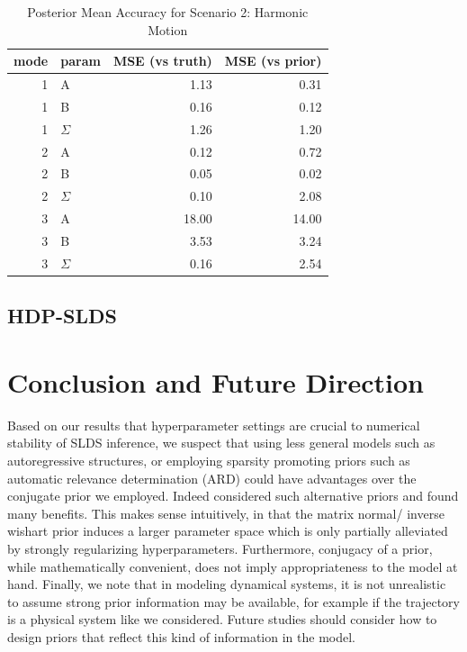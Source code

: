 \documentclass{article} %
\begin{document}
\begin{table}[]
\centering
\caption{Posterior Mean Accuracy for Scenario 2: Harmonic Motion}
\label{tbl:scen2}
\begin{tabular}{rlrr}
\hline
mode & param & MSE (vs truth) & MSE (vs prior) \\ \hline
1    & A     & 1.13      & 0.31       \\
1    & B     & 0.16      & 0.12       \\
1    & $\Sigma$ & 1.26      & 1.20       \\
2    & A     & 0.12      & 0.72       \\
2    & B     & 0.05      & 0.02       \\
2    & $\Sigma$ & 0.10      & 2.08       \\
3    & A     & 18.00     & 14.00      \\
3    & B     & 3.53      & 3.24       \\
3    & $\Sigma$ & 0.16      & 2.54       \\ \hline
\end{tabular}
\end{table}

\subsection{HDP-SLDS}

\section{Conclusion and Future Direction}

Based on our results that hyperparameter settings are crucial to numerical stability of SLDS inference, we suspect that using less general models such as autoregressive structures, or employing sparsity promoting priors such as automatic relevance determination (ARD) could have advantages over the conjugate prior we employed. Indeed \cite{fox_bayesian_2009} considered such alternative priors and found many benefits. This makes sense intuitively, in that the matrix normal/ inverse wishart prior induces a larger parameter space which is only partially alleviated by strongly regularizing hyperparameters. Furthermore, conjugacy of a prior, while mathematically convenient, does not imply appropriateness to the model at hand. Finally, we note that in modeling dynamical systems, it is not unrealistic to assume strong prior information may be available, for example if the trajectory is a physical system like we considered. Future studies should consider how to design priors that reflect this kind of information in the model.
\end{document}

